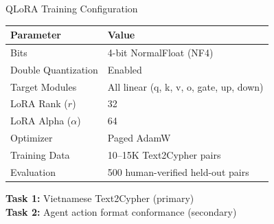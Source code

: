 \documentclass[aspectratio=169]{beamer}
\begin{document}
\begin{frame}{QLoRA Training Configuration}
\vspace{4pt}
\begin{center}
\begin{tabular}{ll}
\toprule
\textbf{Parameter} & \textbf{Value} \\
\midrule
Bits & 4-bit NormalFloat (NF4) \\
Double Quantization & Enabled \\
Target Modules & All linear (q, k, v, o, gate, up, down) \\
LoRA Rank ($r$) & 32 \\
LoRA Alpha ($\alpha$) & 64 \\
Optimizer & Paged AdamW \\
Training Data & 10--15K Text2Cypher pairs \\
Evaluation & 500 human-verified held-out pairs \\
\bottomrule
\end{tabular}
\end{center}
\vspace{0.3em}
\textbf{Task 1:} Vietnamese Text2Cypher (primary)\\
\textbf{Task 2:} Agent action format conformance (secondary)
\end{frame}
\end{document}
